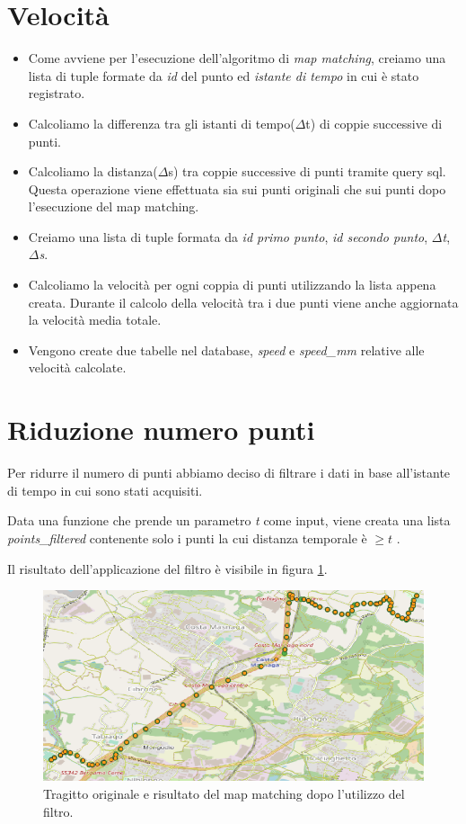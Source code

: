 \documentclass[12pt]{report}
\begin{document}
\chapter*{Velocità}
\begin{itemize}
	\item Come avviene per l'esecuzione dell'algoritmo di \textit{map matching}, creiamo una lista di tuple formate da \textit{id} del punto ed \textit{istante di tempo} in cui è stato registrato.
	\item Calcoliamo la differenza tra gli istanti di tempo($\Delta$t) di coppie successive di punti.
	\item Calcoliamo la distanza($\Delta$s) tra coppie successive di punti tramite query sql. Questa operazione viene effettuata sia sui punti originali che sui punti dopo l'esecuzione del map matching.
	\item Creiamo una lista di tuple formata da \textit{id primo punto}, \textit{id secondo punto}, \textit{$\Delta$t}, \textit{$\Delta$s}.
	\item Calcoliamo la velocità per ogni coppia di punti utilizzando la lista appena creata. Durante il calcolo della velocità tra i due punti viene anche aggiornata la velocità media totale.
	\item Vengono create due tabelle nel database, \textit{speed} e \textit{speed\_mm} relative alle velocità calcolate.
\end{itemize}
\chapter*{Riduzione numero punti}
Per ridurre il numero di punti abbiamo deciso di filtrare i dati in base all'istante di tempo in cui sono stati acquisiti.

Data una funzione che prende un parametro \textit{t} come input, viene creata una lista \textit{points\_filtered} contenente solo i punti la cui distanza temporale è $ \ge t $ .

Il risultato dell'applicazione del filtro è visibile in figura \ref{filter}.
\begin{figure}
	\centering
	\includegraphics[scale = 0.43]{figures/tragitto_filtered}
	\caption{Tragitto originale e risultato del map matching dopo l'utilizzo del filtro.}\label{filter}
\end{figure}
	
	
	
	
\end{document}
